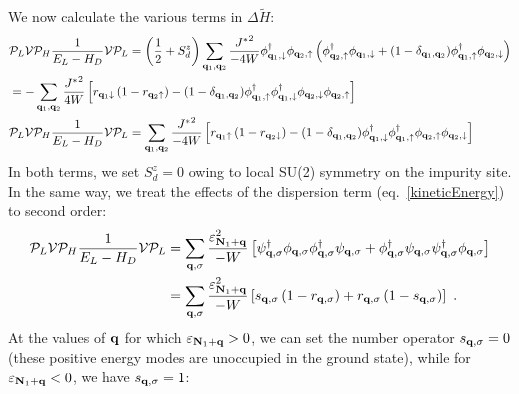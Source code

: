 \documentclass[reprint,hidelinks,onecolumn]{revtex4-2}
\begin{document}
We now calculate the various terms in \(\Delta \tilde H\):
\begin{equation}\begin{aligned}\label{kondoPert}
	&\mathcal{P}_L \mathcal{V} \mathcal{P}_H\frac{1}{E_L - H_D} \mathcal{V} \mathcal{P}_L = \left(\frac{1}{2} + S_d^z\right) \sum_{{\bf q}_1,{\bf q}_2}\frac{{J^*}^2}{-4W}\phi^\dagger_{{\bf q}_1,\downarrow}\phi_{{\bf q}_2, \uparrow} \left(\phi^\dagger_{{\bf q}_2,\uparrow}\phi_{{\bf q}_1, \downarrow} + (1 - \delta_{{\bf q}_1,{\bf q}_2})\phi^\dagger_{{\bf q}_1,\uparrow}\phi_{{\bf q}_2, \downarrow}\right)\\
	&= -\sum_{{\bf q}_1,{\bf q}_2}\frac{{J^*}^2}{4W}\left[r_{{\bf q}_1 \downarrow} \left(1 - r_{{\bf q}_2 \uparrow}\right) - (1 - \delta_{{\bf q}_1,{\bf q}_2})\phi^\dagger_{{\bf q}_1,\uparrow}\phi^\dagger_{{\bf q}_1,\downarrow}\phi_{{\bf q}_2, \downarrow}\phi_{{\bf q}_2, \uparrow}\right]\\
	&\mathcal{P}_L \mathcal{V} \mathcal{P}_H\frac{1}{E_L - H_D} \mathcal{V} \mathcal{P}_L = \sum_{{\bf q}_1,{\bf q}_2}\frac{{J^*}^2}{-4W}\left[r_{{\bf q}_1 \uparrow} \left(1 - r_{{\bf q}_2 \downarrow}\right) - (1 - \delta_{{\bf q}_1,{\bf q}_2})\phi^\dagger_{{\bf q}_1,\downarrow}\phi^\dagger_{{\bf q}_1,\uparrow}\phi_{{\bf q}_2, \uparrow}\phi_{{\bf q}_2, \downarrow}\right] \\
\end{aligned}\end{equation}
In both terms, we set \(S_d^z = 0\) owing to local SU(2) symmetry on the impurity site. In the same way, we treat the effects of the dispersion term (eq.~\ref{kineticEnergy}) to second order:
\begin{equation}\begin{aligned}
	\mathcal{P}_L \mathcal{V} \mathcal{P}_H\frac{1}{E_L - H_D} \mathcal{V} \mathcal{P}_L &= \sum_{{\bf q}, \sigma}\frac{\varepsilon_{{\bf N}_1 + {\bf q}}^2}{-W}\left[ {\psi}^\dagger_{{\bf q},\sigma} {\phi}_{{\bf q},\sigma}{\phi}^\dagger_{{\bf q},\sigma} \psi_{{\bf q},\sigma} + {\phi}^\dagger_{{\bf q},\sigma} \psi_{{\bf q},\sigma}{\psi}^\dagger_{{\bf q},\sigma} {\phi}_{{\bf q},\sigma}\right] \\
																						 &= \sum_{{\bf q}, \sigma}\frac{\varepsilon_{{\bf N}_1 + {\bf q}}^2}{-W}\left[ s_{{\bf q},\sigma} \left(1 - r_{{\bf q},\sigma}\right) + r_{{\bf q},\sigma} \left(1 - s_{{\bf q},\sigma}\right)\right]~.
\end{aligned}\end{equation}
At the values of \({\bf q}\) for which \(\varepsilon_{{\bf N}_1 + {\bf q}} > 0\), we can set the number operator \(s_{{\bf q},\sigma} = 0\) (these positive energy modes are unoccupied in the ground state), while for \(\varepsilon_{{\bf N}_1 + {\bf q}} < 0\), we have \(s_{{\bf q},\sigma} = 1\):
\end{document}
